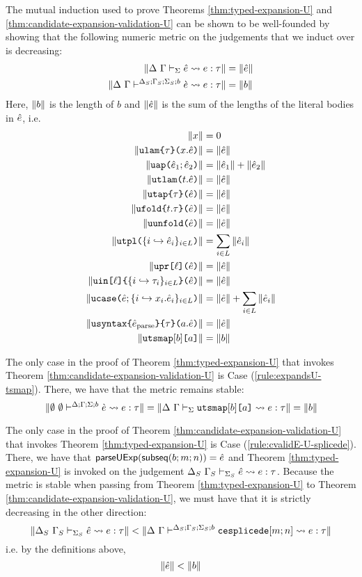 The mutual induction used to prove Theorems \ref{thm:typed-expansion-U} and \ref{thm:candidate-expansion-validation-U} can be shown to be well-founded by showing that the following numeric metric on the judgements that we induct over is decreasing:
\begin{align*}
\Vert \Delta~\Gamma \vdash_{\Sigma} \hat{e} \leadsto e : \tau \Vert & = \Vert \hat{e} \Vert\\
\Vert \Delta~\Gamma\vdash^{\Delta_S; \Gamma_S; \Sigma_S; b} \grave{e} \leadsto e : \tau \Vert & = \Vert b \Vert
\end{align*}
Here, $\Vert b \Vert$ is the length of $b$ and $\Vert \hat{e} \Vert$ is the sum of the lengths of the literal bodies in $\hat{e}$, i.e. 
\begin{align*}
\Vert x \Vert & = 0\\
\Vert \texttt{ulam}\texttt{\{}\tau\texttt{\}(}x.\hat{e}\texttt{)} \Vert &= \Vert \hat{e} \Vert\\
\Vert \texttt{uap}\texttt{(}\hat{e}_1; \hat{e}_2\texttt{)} \Vert & = \Vert \hat{e}_1 \Vert + \Vert \hat{e}_2 \Vert\\
\Vert \texttt{utlam}\texttt{(}t.\hat{e}\texttt{)} \Vert & = \Vert \hat{e} \Vert\\
\Vert \texttt{utap}\texttt{\{}\tau\texttt{\}(}\hat{e}\texttt{)} \Vert & = \Vert \hat{e} \Vert\\
\Vert \texttt{ufold}\texttt{\{}t.\tau\texttt{\}(}\hat{e}\texttt{)} \Vert & = \Vert \hat{e} \Vert\\
\Vert \texttt{uunfold}\texttt{(}\hat{e}\texttt{)} \Vert & = \Vert \hat{e} \Vert\\
\Vert \texttt{utpl}\texttt{(}\{i \hookrightarrow \hat{e}_{i}\}_{i \in L}\texttt{)} \Vert & = \sum_{i \in L} \Vert \hat{e}_i \Vert\\
\Vert \texttt{upr}\texttt{[}\ell\texttt{](}\hat{e}\texttt{)} \Vert & = \Vert \hat{e} \Vert\\
\Vert \texttt{uin}\texttt{[}\ell\texttt{]\{}\{i \hookrightarrow \tau_{i}\}_{i \in L}\texttt{\}(}\hat{e}\texttt{)} \Vert & = \Vert \hat{e} \Vert\\
\Vert \texttt{ucase}\texttt{(}\hat{e}; \{i \hookrightarrow x_{i}.\hat{e}_{i}\}_{i \in L}\texttt{)} \Vert & = \Vert \hat{e} \Vert + \sum_{i \in L} \Vert \hat{e}_i \Vert\\
\Vert \texttt{usyntax}\texttt{\{}\hat{e}_\text{parse}\texttt{\}\{}\tau\texttt{\}(}a.\hat{e}\texttt{)} \Vert & = \Vert \hat{e} \Vert\\
\Vert \texttt{utsmap}[b]\texttt{[}a\texttt{]} \Vert & = \Vert b \Vert
\end{align*}

The only case in the proof of Theorem \ref{thm:typed-expansion-U} that invokes Theorem \ref{thm:candidate-expansion-validation-U} is Case (\ref{rule:expandsU-tsmap}). There, we have that the metric remains stable: \[\Vert \emptyset~\emptyset\vdash^{\Delta; \Gamma; \Sigma; b} \grave{e} \leadsto e : \tau \Vert = \Vert \Delta~\Gamma \vdash_{\Sigma} \texttt{utsmap}[b]\texttt{[}a\texttt{]} \leadsto e : \tau \Vert=\Vert b \Vert\]

The only case in the proof of Theorem \ref{thm:candidate-expansion-validation-U} that invokes Theorem \ref{thm:typed-expansion-U} is Case (\ref{rule:cvalidE-U-splicede}). There, we have that $\mathsf{parseUExp}(\mathsf{subseq}(b; m; n))=\hat{e}$ and Theorem \ref{thm:typed-expansion-U} is invoked on the judgement $\Delta_S~\Gamma_S \vdash_{\Sigma_S} \hat{e} \leadsto e : \tau$. Because the metric is stable when passing from Theorem \ref{thm:typed-expansion-U} to Theorem \ref{thm:candidate-expansion-validation-U}, we must have that it is strictly decreasing in the other direction:
\[\Vert \Delta_S~\Gamma_S \vdash_{\Sigma_S} \hat{e} \leadsto e : \tau \Vert < \Vert \Delta~\Gamma\vdash^{\Delta_S; \Gamma_S; \Sigma_S; b} \texttt{cesplicede}[m; n] \leadsto e : \tau \Vert\]
i.e. by the definitions above, 
\[\Vert \hat{e} \Vert < \Vert b \Vert\]

